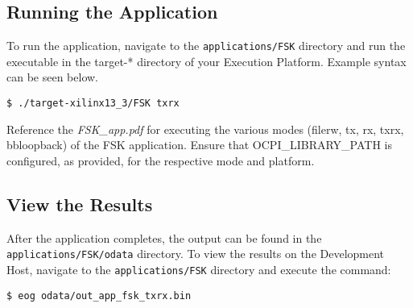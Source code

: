 \begin{flushleft}
\subsection{Running the Application}
To run the application, navigate to the \texttt{applications/FSK} directory and run the executable in the target-* directory of your Execution Platform. Example syntax can be seen below.
\begin{verbatim}
$ ./target-xilinx13_3/FSK txrx
\end{verbatim}
Reference the \textit{FSK\_app.pdf} for executing the various modes (filerw, tx, rx, txrx, bbloopback) of the FSK application. Ensure that OCPI\_LIBRARY\_PATH is configured, as provided, for the respective mode and platform. \\ \medskip

\subsection{View the Results}
After the application completes, the output can be found in the \texttt{applications/FSK/odata} directory. To view the results on the Development Host, navigate to the \texttt{applications/FSK} directory and execute the command:
\begin{verbatim}
$ eog odata/out_app_fsk_txrx.bin
\end{verbatim}
\end{flushleft}

